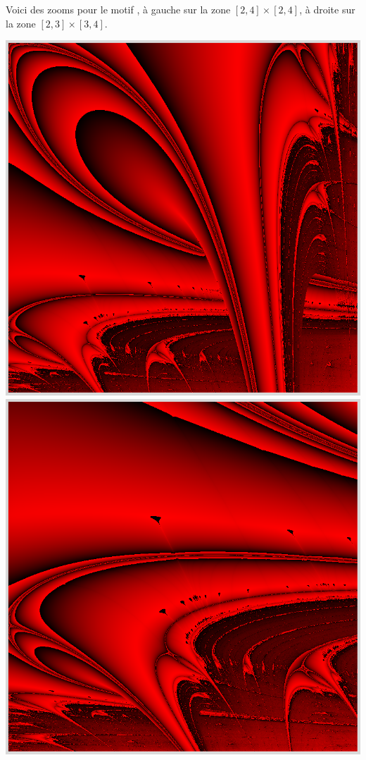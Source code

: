 \documentclass[11pt,class=report,crop=false]{standalone}
\begin{document}
\begin{activite}
Voici des zooms pour le motif , à gauche sur la zone $[2,4]\times [2,4]$,
à droite sur la zone $[2,3]\times[3,4]$. 
\begin{center}
\includegraphics[scale=\myscale,scale=0.2]{ecran-lyapunov-AB-2-4-2-4}\quad
\includegraphics[scale=\myscale,scale=0.2]{ecran-lyapunov-AB-2-3-3-4}
\end{center}

\end{activite}
\end{document}
